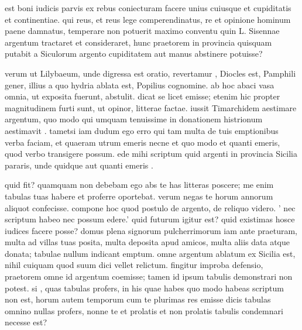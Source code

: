  est boni iudicis parvis ex rebus coniecturam facere unius cuiusque et cupiditatis et continentiae. qui reus, et reus lege comperendinatus, re et opinione hominum paene damnatus, temperare non potuerit maximo conventu quin L. Sisennae argentum tractaret et consideraret, hunc praetorem in provincia quisquam putabit a Siculorum argento cupiditatem aut manus abstinere potuisse?

 verum ut Lilybaeum, unde digressa est oratio, revertamur , Diocles est, Pamphili gener, illius a quo hydria ablata est, Popilius cognomine. ab hoc abaci vasa omnia, ut exposita fuerunt, abstulit. dicat se licet emisse; etenim hic propter magnitudinem furti sunt, ut opinor, litterae factae. iussit Timarchidem aestimare argentum, quo modo qui umquam tenuissime in donationem histrionum aestimavit . tametsi iam dudum ego erro qui tam multa de tuis emptionibus verba faciam, et quaeram utrum emeris necne et quo modo et quanti emeris, quod verbo transigere possum. ede mihi scriptum quid argenti in provincia Sicilia pararis, unde quidque aut quanti emeris .

 quid fit? quamquam non debebam ego abs te has litteras poscere; me enim tabulas tuas habere et proferre oportebat. verum negas te horum annorum aliquot confecisse. compone hoc quod postulo de argento, de reliquo videro. ' nec scriptum habeo nec possum edere.' quid futurum igitur est? quid existimas hosce iudices facere posse? domus plena signorum pulcherrimorum iam ante praeturam, multa ad villas tuas posita, multa deposita apud amicos, multa aliis data atque donata; tabulae nullum indicant emptum. omne argentum ablatum ex Sicilia est, nihil cuiquam quod suum dici vellet relictum. fingitur improba defensio, praetorem omne id argentum coemisse; tamen id ipsum tabulis demonstrari non potest. si , quas tabulas profers, in his quae habes quo modo habeas scriptum non est, horum autem temporum cum te plurimas res emisse dicis tabulas omnino nullas profers, nonne te et prolatis et non prolatis tabulis condemnari necesse est?

